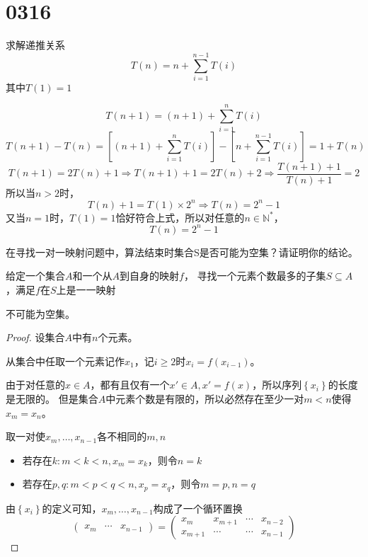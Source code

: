 \section{0316}
\begin{questions}

    \question 求解递推关系$$T(n) = n + \sum_{i=1}^{n-1}{T(i)}$$其中$T(1)=1$
    \begin{solution}
        $$
            T(n+1) = (n+1) + \sum_{i=1}^{n}{T(i)}
        $$
        $$
            T(n+1) - T(n)  = \left[(n+1) + \sum_{i=1}^{n}{T(i)}\right] - \left[n + \sum_{i=1}^{n-1}{T(i)}\right]
            = 1 + T(n)
        $$
        $$
            T(n+1) = 2T(n) + 1 \Rightarrow
            T(n+1) + 1 = 2T(n) + 2 \Rightarrow
            \frac{T(n+1) + 1}{T(n) + 1} = 2
        $$
        所以当$n>2$时，
        $$
            T(n) + 1 = T(1) \times 2^n \Rightarrow
            T(n) = 2^n - 1
        $$
        又当$n=1$时，$T(1) = 1$恰好符合上式，所以对任意的$n \in \mathbb{N}^*$，
        $$
            T(n) = 2^n - 1
        $$
    \end{solution}

    \question 在寻找一对一映射问题中，算法结束时集合S是否可能为空集？请证明你的结论。

    {\kaishu
    给定一个集合$A$和一个从$A$到自身的映射$f$，
    寻找一个元素个数最多的子集$S \subseteq A$，满足$f$在$S$上是一一映射
    }

    \begin{solution}
        不可能为空集。

        \begin{proof}
            设集合$A$中有$n$个元素。

            从集合中任取一个元素记作$x_1$，记$i \geq 2$时$x_{i} = f(x_{i-1})$。

            由于对任意的$x \in A$，都有且仅有一个$x' \in A, x' = f(x)$，所以序列$\left\{x_i\right\}$的长度是无限的。
            但是集合$A$中元素个数是有限的，所以必然存在至少一对$m < n$使得$x_m = x_n$。

            取一对使$x_m, \dots, x_{n-1}$各不相同的$m,n$
            \begin{itemize}
                \item 若存在$k:m < k < n , x_m = x_k$，则令$n = k$
                \item 若存在$p,q:m < p < q < n , x_p = x_q$，则令$m = p, n = q$
            \end{itemize}

            由$\left\{x_i\right\}$的定义可知，$x_m, \dots, x_{n-1}$构成了一个循环置换
            $$
                \left(
                \begin{array}{ccc}
                        x_m & \cdots & x_{n-1}
                    \end{array}
                \right)
                =
                \left(
                \begin{array}{cccc}
                        x_m     & x_{m+1} & \cdots & x_{n-2} \\
                        x_{m+1} & \cdots  & \cdots & x_{n-1}
                    \end{array}
                \right)
            $$


\end{proof}
\end{solution}
\end{questions}
